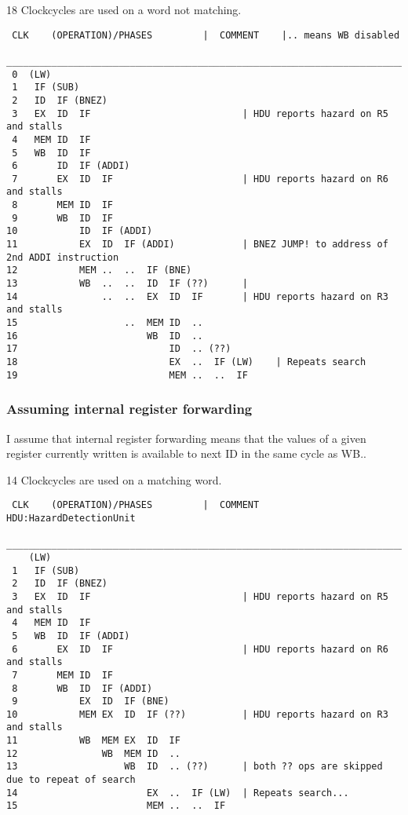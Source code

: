 \documentclass[a4paper,10pt]{article}
\begin{document}
18 Clockcycles are used on a word not matching.
\begin{verbatim}
 CLK    (OPERATION)/PHASES         |  COMMENT    |.. means WB disabled
 ________________________________________________________________________________________________
 0  (LW)  
 1   IF (SUB)
 2   ID  IF (BNEZ) 
 3   EX  ID  IF                           | HDU reports hazard on R5 and stalls
 4   MEM ID  IF     
 5   WB  ID  IF 
 6       ID  IF (ADDI)
 7       EX  ID  IF                       | HDU reports hazard on R6 and stalls
 8       MEM ID  IF    
 9       WB  ID  IF  
10           ID  IF (ADDI)
11           EX  ID  IF (ADDI)            | BNEZ JUMP! to address of 2nd ADDI instruction
12           MEM ..  ..  IF (BNE)
13           WB  ..  ..  ID  IF (??)      | 
14               ..  ..  EX  ID  IF       | HDU reports hazard on R3 and stalls
15                   ..  MEM ID  ..  
16                       WB  ID  .. 
17                           ID  .. (??)
18                           EX  ..  IF (LW)    | Repeats search
19                           MEM ..  ..  IF
\end{verbatim}

\newpage
\subsubsection{Assuming internal register forwarding}
I assume that internal register forwarding means that the values of a given register currently written is available to next ID in the same cycle as WB..

14 Clockcycles are used on a matching word.
\begin{verbatim}
 CLK    (OPERATION)/PHASES         |  COMMENT   HDU:HazardDetectionUnit
 ________________________________________________________________________________________________
    (LW)  
 1   IF (SUB)
 2   ID  IF (BNEZ) 
 3   EX  ID  IF                           | HDU reports hazard on R5 and stalls
 4   MEM ID  IF     
 5   WB  ID  IF (ADDI)
 6       EX  ID  IF                       | HDU reports hazard on R6 and stalls
 7       MEM ID  IF    
 8       WB  ID  IF (ADDI) 
 9           EX  ID  IF (BNE)
10           MEM EX  ID  IF (??)          | HDU reports hazard on R3 and stalls
11           WB  MEM EX  ID  IF           
12               WB  MEM ID  ..   
13                   WB  ID  .. (??)      | both ?? ops are skipped due to repeat of search
14                       EX  ..  IF (LW)  | Repeats search...
15                       MEM ..  ..  IF   
\end{verbatim}
\end{document}
